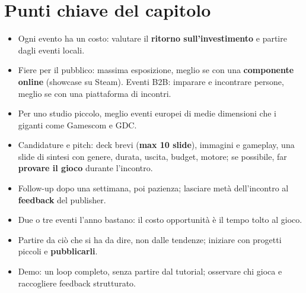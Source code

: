 \section*{Punti chiave del capitolo}

\begin{itemize}
  \item Ogni evento ha un costo: valutare il \textbf{ritorno sull'investimento} e
        partire dagli eventi locali.
  \item Fiere per il pubblico: massima esposizione, meglio se con una
        \textbf{componente online} (showcase su Steam). Eventi B2B: imparare e
        incontrare persone, meglio se con una piattaforma di incontri.
  \item Per uno studio piccolo, meglio eventi europei di medie dimensioni che i
        giganti come Gamescom e GDC.
  \item Candidature e pitch: deck brevi (\textbf{max 10 slide}), immagini e
        gameplay, una slide di sintesi con genere, durata, uscita, budget, motore;
        se possibile, far \textbf{provare il gioco} durante l'incontro.
  \item Follow-up dopo una settimana, poi pazienza; lasciare metà dell'incontro al
        \textbf{feedback} del publisher.
  \item Due o tre eventi l'anno bastano: il costo opportunità è il tempo tolto al
        gioco.
  \item Partire da ciò che si ha da dire, non dalle tendenze; iniziare con progetti
        piccoli e \textbf{pubblicarli}.
  \item Demo: un loop completo, senza partire dal tutorial; osservare chi gioca e
        raccogliere feedback strutturato.
\end{itemize}
